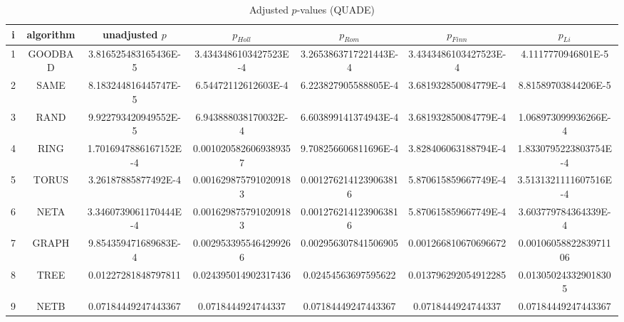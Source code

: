 \documentclass[a4paper,10pt]{article}
\begin{document}
\begin{landscape}
\begin{table}[!htp]
\centering\scriptsize
\caption{Adjusted $p$-values (QUADE)}
\begin{tabular}{ccccccc}
i&algorithm&unadjusted $p$&$p_{Holl}$&$p_{Rom}$&$p_{Finn}$&$p_{Li}$\\
\hline
1& GOODBAD&3.816525483165436E-5&3.4343486103427523E-4&3.2653863717221443E-4&3.4343486103427523E-4&4.1117770946801E-5\\
2& SAME&8.183244816445747E-5&6.54472112612603E-4&6.223827905588805E-4&3.681932850084779E-4&8.81589703844206E-5\\
3& RAND&9.922793420949552E-5&6.943888038170032E-4&6.603899141374943E-4&3.681932850084779E-4&1.068973099936266E-4\\
4& RING&1.7016947886167152E-4&0.0010205826069389357&9.708256606811696E-4&3.828406063188794E-4&1.8330795223803754E-4\\
5& TORUS&3.26187885877492E-4&0.0016298757910209183&0.0012762141239063816&5.870615859667749E-4&3.5131321111607516E-4\\
6& NETA&3.3460739061170444E-4&0.0016298757910209183&0.0012762141239063816&5.870615859667749E-4&3.603779784364339E-4\\
7& GRAPH&9.854359471689683E-4&0.0029533955464299266&0.002956307841506905&0.001266810670696672&0.0010605882283971106\\
8& TREE&0.01227281848797811&0.024395014902317436&0.02454563697595622&0.013796292054912285&0.013050243329018305\\
9& NETB&0.07184449247443367&0.0718444924744337&0.07184449247443367&0.0718444924744337&0.07184449247443367\\
\hline
\end{tabular}
\end{table}

\end{landscape}
\end{document}
